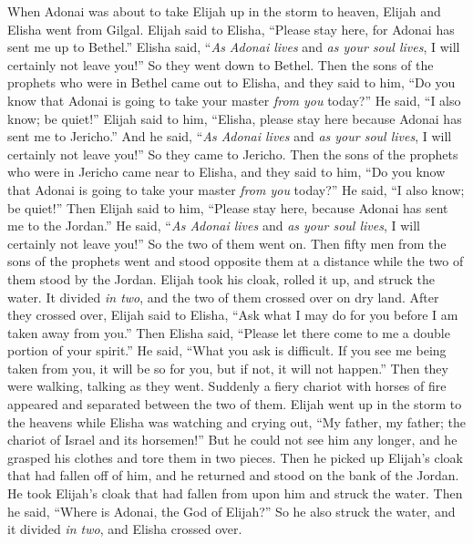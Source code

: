 \begin{biblechapter} %
 When Adonai was about to take Elijah up in the storm to heaven, Elijah and Elisha went from Gilgal.
\verse Elijah said to Elisha, “Please stay here, for Adonai has sent me up to Bethel.” Elisha said, “\textit{As Adonai lives} and \textit{as your soul lives}, I will certainly not leave you!” So they went down to Bethel.
\verse Then the sons of the prophets who were in Bethel came out to Elisha, and they said to him, “Do you know that Adonai is going to take your master \textit{from you} today?” He said, “I also know; be quiet!”
\verse Elijah said to him, “Elisha, please stay here because Adonai has sent me to Jericho.” And he said, “\textit{As Adonai lives} and \textit{as your soul lives}, I will certainly not leave you!” So they came to Jericho.
\verse Then the sons of the prophets who were in Jericho came near to Elisha, and they said to him, “Do you know that Adonai is going to take your master \textit{from you} today?” He said, “I also know; be quiet!”
\verse Then Elijah said to him, “Please stay here, because Adonai has sent me to the Jordan.” He said, “\textit{As Adonai lives} and \textit{as your soul lives}, I will certainly not leave you!” So the two of them went on.
\verse Then fifty men from the sons of the prophets went and stood opposite them at a distance while the two of them stood by the Jordan.
\verse Elijah took his cloak, rolled it up, and struck the water. It divided \textit{in two}, and the two of them crossed over on dry land.
\verse After they crossed over, Elijah said to Elisha, “Ask what I may do for you before I am taken away from you.” Then Elisha said, “Please let there come to me a double portion of your spirit.”
\verse He said, “What you ask is difficult. If you see me being taken from you, it will be so for you, but if not, it will not happen.”
\verse Then they were walking, talking as they went. Suddenly a fiery chariot with horses of fire appeared and separated between the two of them. Elijah went up in the storm to the heavens
\verse while Elisha was watching and crying out, “My father, my father; the chariot of Israel and its horsemen!” But he could not see him any longer, and he grasped his clothes and tore them in two pieces.
\verse Then he picked up Elijah’s cloak that had fallen off of him, and he returned and stood on the bank of the Jordan.
\verse He took Elijah’s cloak that had fallen from upon him and struck the water. Then he said, “Where is Adonai, the God of Elijah?” So he also struck the water, and it divided \textit{in two}, and Elisha crossed over.

\end{biblechapter}
